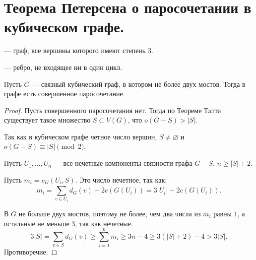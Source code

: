 \section{Теорема Петерсена о паросочетании в кубическом графе.}
\begin{definition}
     --- граф, все вершины которого имеют степень $3$.
\end{definition}
\begin{definition}
     --- ребро, не входящее ни в один цикл.
\end{definition}
\begin{theorem}[Петерсон, 1891]
	Пусть $G$ --- связный кубический граф, в котором не более двух мостов. Тогда в графе есть совершенное паросочетание.
\end{theorem}
\begin{proof}
    Пусть совершенного паросочетания нет. Тогда по Теореме Тaтта существует такое множество $S \subset V(G)$, что $o(G-S) > \lvert S \rvert$.

	Так как в кубическом графе четное число вершин, $S \neq \varnothing$ и $o(G-S) \equiv \lvert S \rvert \pmod 2$.

	Пусть $U_1, \ldots , U_n$ --- все нечетные компоненты связности графа $G - S$. $n \ge \lvert S \rvert + 2$.

	Пусть $m_i = e_G(U_i, S)$. Это число нечетное, так как:
	\[
	m_i = \sum_{v \in U_i}^{} d_G(v) - 2 e(G(U_i)) = 3 \lvert U_i \rvert - 2e(G(U_i))
	.\] 

	В $G$ не больше двух мостов, поэтому не более, чем два числа из $m_i$ равны $1$, а остальные не меньше $3$, так как нечетные.
	\[
	3 \lvert S \rvert = \sum_{v \in S}^{} d_G(v) \ge  \sum_{i=1}^{n} m_i \ge 3n-4 \ge 3(\lvert S \rvert+2) -4 > 3 \lvert S \rvert
	.\] 
	Противоречие. 
\end{proof}
